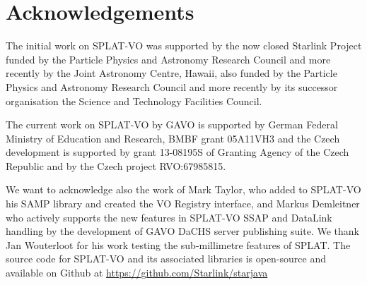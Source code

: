 \documentclass[final,authoryear,5p,times,twocolumn]{elsarticle}
\begin{document}
\section*{Acknowledgements}

The initial work on SPLAT-VO was supported
by the now closed Starlink Project funded by the Particle Physics and
Astronomy Research Council and more recently by the Joint Astronomy
Centre, Hawaii, also funded by the Particle Physics and Astronomy
Research Council and more recently by its successor organisation the
Science and Technology Facilities Council.

The current work on SPLAT-VO by GAVO is supported by German Federal
Ministry of Education and Research, BMBF grant 05A11VH3 and the Czech
development is supported by grant 13-08195S of Granting Agency of the
Czech Republic and by the Czech project RVO:67985815.

We want to acknowledge also the work of Mark Taylor, who added to
SPLAT-VO his SAMP library and created the VO Registry interface, and
Markus Demleitner who actively supports the new features in SPLAT-VO SSAP
and DataLink handling by the development of GAVO DaCHS server publishing suite.
We thank Jan Wouterloot for his work testing the sub-millimetre
features of SPLAT.
The source code for SPLAT-VO and its associated libraries is
open-source and available on Github at
\url{https://github.com/Starlink/starjava}









\end{document}
